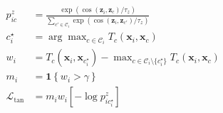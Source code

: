 \documentclass[border=1pt]{standalone}
\begin{document}
\color[HTML]{1F3342}
\(\displaystyle
\begin{aligned}
p^z_{ic}
&=\frac{\exp(\cos(\mathbf{z}_i,\mathbf{z}_c)/\tau_z)}
{\sum_{c'\in\mathcal{C}_i}\exp(\cos(\mathbf{z}_i,\mathbf{z}_{c'})/\tau_z)}\\
c_i^\star&=\arg\max_{c\in\mathcal{C}_i}T_c(\mathbf{x}_i,\mathbf{x}_c)\\
w_i&=T_c(\mathbf{x}_i,\mathbf{x}_{c_i^\star})
-\max_{c\in\mathcal{C}_i\setminus\{c_i^\star\}}T_c(\mathbf{x}_i,\mathbf{x}_c)\\
m_i&=\mathbf{1}\!\left\{w_i>\gamma\right\}\\
\mathcal{L}_{\mathrm{tan}}
&=m_i w_i\left[-\log p^z_{i c_i^\star}\right]
\end{aligned}
\)
\end{document}
